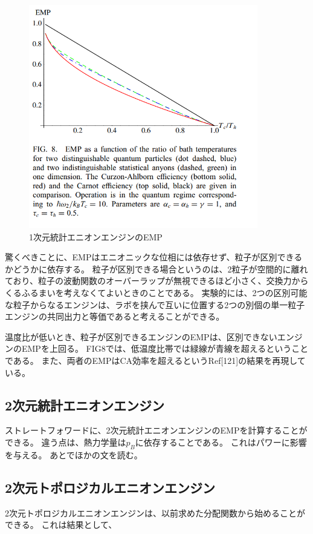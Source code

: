\documentclass[a4paper,11pt]{jsarticle}
\numberwithin{equation}{section}
\begin{document}
\begin{figure}[htbp]
  \begin{center}
    \includegraphics[width=100mm]{fig8.png}
    \caption{1次元統計エニオンエンジンのEMP}
  \end{center}
\end{figure}

驚くべきことに、EMPはエニオニックな位相には依存せず、粒子が区別できるかどうかに依存する。
粒子が区別できる場合というのは、2粒子が空間的に離れており、粒子の波動関数のオーバーラップが無視できるほど小さく、交換力からくるふるまいを考えなくてよいときのことである。
実験的には、2つの区別可能な粒子からなるエンジンは、ラボを挟んで互いに位置する2つの別個の単一粒子エンジンの共同出力と等価であると考えることができる。

温度比が低いとき、粒子が区別できるエンジンのEMPは、区別できないエンジンのEMPを上回る。
FIG8では、低温度比帯では緑線が青線を超えるということである。
また、両者のEMPはCA効率を超えるというRef[121]の結果を再現している。

\subsection{2次元統計エニオンエンジン}
ストレートフォワードに、2次元統計エニオンエンジンのEMPを計算することができる。
違う点は、熱力学量は$p_B$に依存することである。
これはパワーに影響を与える。
あとでほかの文を読む。

\subsection{2次元トポロジカルエニオンエンジン}
2次元トポロジカルエニオンエンジンは、以前求めた分配関数から始めることができる。
これは結果として、
\end{document}
